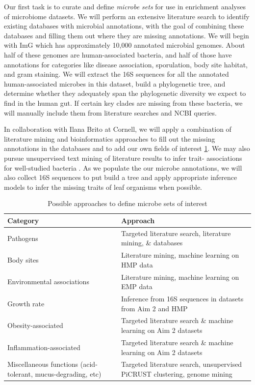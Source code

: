 \documentclass[12pt]{article}
\begin{document}
Our first task is to curate and define \textit{microbe sets} for use in enrichment analyses of 
microbiome datasets. We will perform an extensive literature search
to identify existing databases with microbial annotations, with the goal of
combining these databases and filling them out where they are missing annotations.
We will begin with ImG which has approximately 10,000 annotated microbial genomes. 
About half of these genomes are human-associated bacteria, 
and half of those have annotations for categories like disease 
association, sporulation, body site habitat, and gram staining. 
We will extract the 16S sequences for all the annotated human-associated 
microbes in this dataset, build a phylogenetic tree, and determine whether 
they adequately span the phylogenetic diversity we expect to 
find in the human gut. If certain key clades are missing from these 
bacteria, we will manually include them from literature searches and 
NCBI queries.

In collaboration with Ilana Brito at Cornell, we will apply a 
combination of literature mining and bioinformatics approaches to fill 
out the missing annotations in the databases and to add our own fields 
of interest \ref{tab:microbe_set_categories}. We may also 
pursue unsupervised text mining of literature results to infer trait-
associations for well-studied bacteria \cite{korbel-lit_mining-2005}. As we populate the 
our microbe annotations, we will also collect 16S sequences to 
put build a tree and apply appropriate inference models to infer the missing 
traits of leaf organisms when possible.

\begin{table}
\begin{tabular}{|p{6cm}|p{10cm}|}
	\hline
	\textbf{Category} & \textbf{Approach} \\
	\hline
	Pathogens & Targeted literature search, literature mining, \& 
	databases \\
	\hline
	Body sites & Literature mining, machine learning on HMP data \\
	\hline
	Environmental associations & Literature mining, machine learning 
	on EMP data \\
	\hline
	Growth rate & Inference from 16S sequences in datasets from Aim 2 
	and HMP \\
	\hline
	Obesity-associated & Targeted literature search \& machine 
	learning on Aim 2 datasets \\
	\hline
	Inflammation-associated & Targeted literature search \& machine 
	learning on Aim 2 datasets \\
	\hline
	Miscellaneous functions (acid-tolerant, mucus-degrading, etc) & 
	Targeted literature search, unsupervised PiCRUST clustering, 
	genome mining \\
	\hline 
\end{tabular}
\caption{Possible approaches to define microbe sets of interest}\label{tab:microbe_set_categories}
\end{table}
\end{document}
